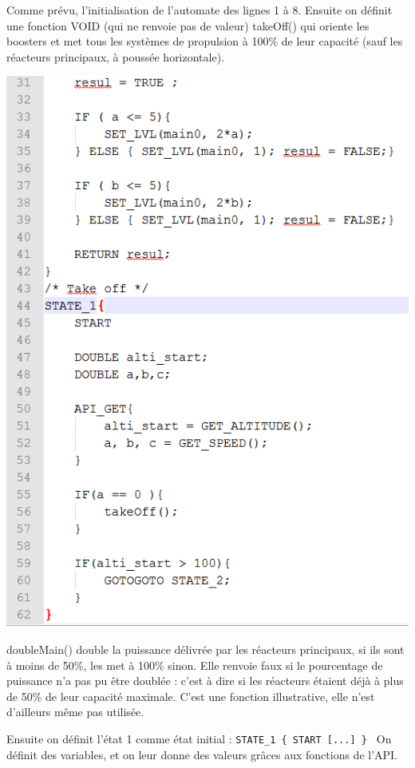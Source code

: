 \documentclass[a4paper,11pt]{article}
\begin{document}
Comme prévu, l'initialisation de l'automate des lignes 1 à 8. Ensuite on définit une fonction VOID (qui ne renvoie pas de valeur) takeOff() qui oriente les boosters et met tous les systèmes de propulsion à 100\% de leur capacité (sauf les réacteurs principaux, à poussée horizontale). 


\begin{center}
	\includegraphics[scale=0.75]{img/otto2.png}
\end{center}
doubleMain() double la puissance délivrée par les réacteurs principaux, si ils sont à moins de 50\%, les met à 100\% sinon. Elle renvoie faux si le pourcentage de puissance n'a pas pu être doublée : c'est à dire si les réacteurs étaient déjà à plus de 50\% de leur capacité maximale. C'est une fonction illustrative, elle n'est d'ailleurs même pas utilisée.

Ensuite on définit l'état 1 comme état initial : \texttt{STATE\_1 \{ START [...] \} }
On définit des variables, et on leur donne des valeurs grâces aux fonctions de l'API.
\end{document}
